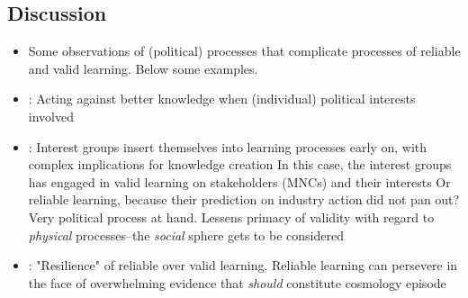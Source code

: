 
\subsection*{Discussion}

\begin{itemize}
	\item Some observations of (political) processes that complicate processes of reliable and valid learning. Below some examples.
	\item \citet{Pailler2018}:
		\subitem Acting against better knowledge when (individual) political interests involved
	\item \citet{Aronczyk2019}:
		\subitem Interest groups insert themselves into learning processes early on, with complex implications for knowledge creation
		\subitem In this case, the interest groups has engaged in valid learning on stakeholders (MNCs) and their interests
			\subsubitem Or reliable learning, because their prediction on industry action did not pan out? Very political process at hand.
		\subitem Lessens primacy of validity with regard to \textit{physical} processes--the \textit{social} sphere gets to be considered
	\item \citet{Boudet2020}:
		\subitem "Resilience" of reliable over valid learning. Reliable learning can persevere in the face of overwhelming evidence that \textit{should} constitute cosmology episode
\end{itemize}